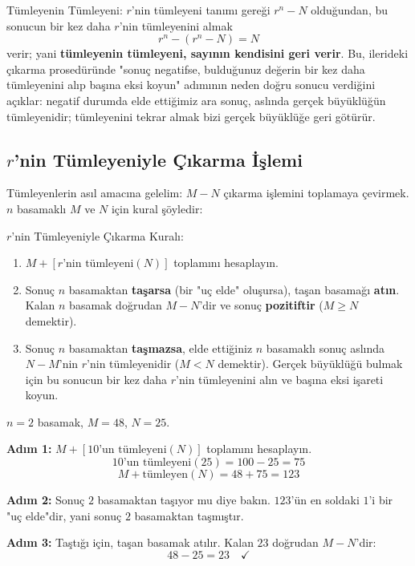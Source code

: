 \begin{tanim}{Tümleyenin Tümleyeni:}
$r$'nin tümleyeni tanımı gereği $r^n-N$ olduğundan, bu sonucun bir kez daha $r$'nin
tümleyenini almak
\[
r^n-(r^n-N) = N
\]
verir; yani \textbf{tümleyenin tümleyeni, sayının kendisini geri verir}. Bu, ilerideki
çıkarma prosedüründe "sonuç negatifse, bulduğunuz değerin bir kez daha tümleyenini alıp
başına eksi koyun" adımının neden doğru sonucu verdiğini açıklar: negatif durumda elde
ettiğimiz ara sonuç, aslında gerçek büyüklüğün tümleyenidir; tümleyenini tekrar almak bizi
gerçek büyüklüğe geri götürür.
\end{tanim}

\subsection{$r$'nin Tümleyeniyle Çıkarma İşlemi}
\label{sec:cikarma-r-tumleyeni}

Tümleyenlerin asıl amacına gelelim: $M-N$ çıkarma işlemini toplamaya çevirmek. $n$ basamaklı
$M$ ve $N$ için kural şöyledir:

\begin{tanim}{$r$'nin Tümleyeniyle Çıkarma Kuralı:}
\begin{enumerate}[nosep, leftmargin=*]
    \item $M + [r\text{'nin tümleyeni}(N)]$ toplamını hesaplayın.
    \item Sonuç $n$ basamaktan \textbf{taşarsa} (bir "uç elde" oluşursa), taşan basamağı
    \textbf{atın}. Kalan $n$ basamak doğrudan $M-N$'dir ve sonuç \textbf{pozitiftir}
    ($M \ge N$ demektir).
    \item Sonuç $n$ basamaktan \textbf{taşmazsa}, elde ettiğiniz $n$ basamaklı sonuç aslında
    $N-M$'nin $r$'nin tümleyenidir ($M<N$ demektir). Gerçek büyüklüğü bulmak için bu
    sonucun bir kez daha $r$'nin tümleyenini alın ve başına eksi işareti koyun.
\end{enumerate}
\end{tanim}

\begin{ornek}
$n=2$ basamak, $M=48$, $N=25$.

\noindent\textbf{Adım 1:} $M+[10\text{'un tümleyeni}(N)]$ toplamını hesaplayın.
\[
10\text{'un tümleyeni}(25) = 100-25=75
\]
\[
M+\text{tümleyen}(N) = 48+75=123
\]

\noindent\textbf{Adım 2:} Sonuç $2$ basamaktan taşıyor mu diye bakın. $123$'ün en soldaki
$1$'i bir "uç elde"dir, yani sonuç $2$ basamaktan taşmıştır.

\noindent\textbf{Adım 3:} Taştığı için, taşan basamak atılır. Kalan $23$ doğrudan
$M-N$'dir:
\[
48-25=23 \quad \checkmark
\]
\end{ornek}

